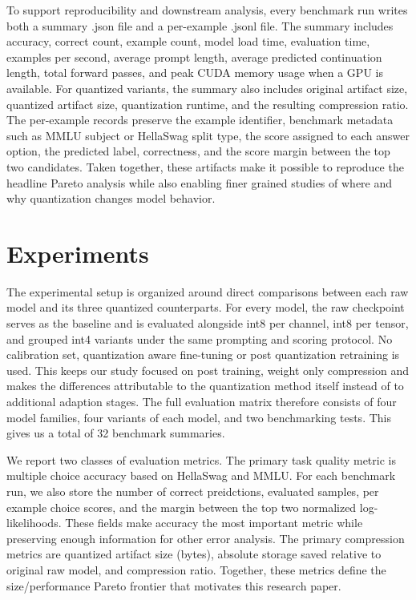 \documentclass[11pt,twocolumn]{article}
\begin{document}
To support reproducibility and downstream analysis, every benchmark run writes both a summary .json file and a per-example .jsonl file. The summary includes accuracy, correct count, example count, model load time, evaluation time, examples per second, average prompt length, average predicted continuation length, total forward passes, and peak CUDA memory usage when a GPU is available. For quantized variants, the summary also includes original artifact size, quantized artifact size, quantization runtime, and the resulting compression ratio. The per-example records preserve the example identifier, benchmark metadata such as MMLU subject or HellaSwag split type, the score assigned to each answer option, the predicted label, correctness, and the score margin between the top two candidates. Taken together, these artifacts make it possible to reproduce the headline Pareto analysis while also enabling finer grained studies of where and why quantization changes model behavior.

\section{Experiments}
The experimental setup is organized around direct comparisons between each raw model and its three quantized counterparts. For every model, the raw checkpoint serves as the baseline and is evaluated alongside int8 per channel, int8 per tensor, and grouped int4 variants under the same prompting and scoring protocol. No calibration set, quantization aware fine-tuning or post quantization retraining is used. This keeps our study focused on post training, weight only compression and makes the differences attributable to the quantization method itself instead of to additional adaption stages. The full evaluation matrix therefore consists of four model families, four variants of each model, and two benchmarking tests. This gives us a total of 32 benchmark summaries.

We report two classes of evaluation metrics. The primary task quality metric is multiple choice accuracy based on HellaSwag and MMLU. For each benchmark run, we also store the number of correct preidctions, evaluated samples, per example choice scores, and the margin between the top two normalized log-likelihoods. These fields make accuracy the most important metric while preserving enough information for other error analysis. The primary compression metrics are quantized artifact size (bytes), absolute storage saved relative to original raw model, and compression ratio. Together, these metrics define the size/performance Pareto frontier that motivates this research paper.
\end{document}
